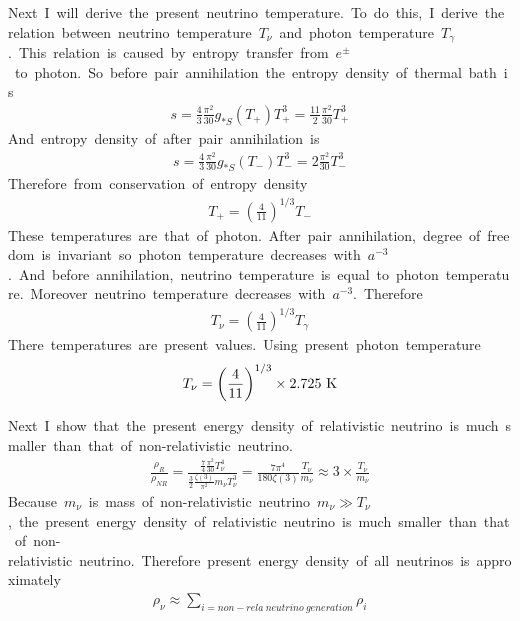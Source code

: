 Next\ I\ will\ derive\ the\ present\ neutrino\ temperature.\ To\ do\ this,\ I\ derive\ the\ relation\ between\ neutrino\ temperature\ $T_{\nu}$\ and\ photon\ temperature\ $T_{\gamma}$.\ This\ relation\ is\ caused\ by\ entropy\ transfer\ from\ $e^{\pm}$\ to\ photon.\ So\ before\ pair\ annihilation\ the\ entropy\ density\ of\ thermal\ bath\ is
\begin{align*}
    s=\frac{4}{3}\frac{\pi^2}{30}g_{*S}(T_+)T_{+}^3=\frac{11}{2}\frac{\pi^2}{30}T_{+}^3
\end{align*}
And\ entropy\ density\ of\ after\ pair\ annihilation\ is
\begin{align*}
    s=\frac{4}{3}\frac{\pi^2}{30}g_{*S}(T_-)T_{-}^3=2\frac{\pi^2}{30}T_{-}^3
\end{align*}
Therefore\ from\ conservation\ of\ entropy\ density
\begin{align*}
    T_+=\left(\frac{4}{11}\right)^{1/3}T_-
\end{align*}
These\ temperatures\ are\ that\ of\ photon.\ After\ pair\ annihilation,\ degree\ of\ freedom\ is\ invariant\ so\ photon\ temperature\ decreases\ with\ $a^{-3}$.\ And\ before\ annihilation,\ neutrino\ temperature\ is\ equal\ to\ photon\ temperature.\ Moreover\ neutrino\ temperature\ decreases\ with\ $a^{-3}$.\ Therefore
\begin{align*}
    T_{\nu}=\left(\frac{4}{11}\right)^{1/3}T_{\gamma}
\end{align*}
There\ temperatures\ are\ present\ values.\ Using\ present\ photon\ temperature
\begin{align*}
    T_{\nu}=\left(\frac{4}{11}\right)^{1/3}\times2.725\ \rm{K}
\end{align*}

Next\ I\ show\ that\ the\ present\ energy\ density\ of\ relativistic\ neutrino\ is\ much\ smaller\ than\ that\ of\ non-relativistic\ neutrino.
\begin{align*}
    \frac{\rho_R}{\rho_{NR}}=\frac{\frac{7}{4}\frac{\pi^2}{30}T^4_{\nu}}{\frac{3}{2}\frac{\zeta(3)}{\pi^2}m_{\nu}T^3_{\nu}}=\frac{7\pi^4}{180\zeta(3)}\frac{T_{\nu}}{m_{\nu}}\approx3\times\frac{T_{\nu}}{m_{\nu}}
\end{align*}
Because\ $m_{\nu}$\ is\ mass\ of\ non-relativistic\ neutrino\ $m_{\nu}\gg T_{\nu}$,\ the\ present\ energy\ density\ of\ relativistic\ neutrino\ is\ much\ smaller\ than\ that\ of\ non-relativistic\ neutrino.\ Therefore\ present\ energy\ density\ of\ all\ neutrinos\ is\ approximately
\begin{align*}
    \rho_{\nu}\approx\sum_{i=non-rela\ neutrino\ generation}\rho_i
\end{align*}

